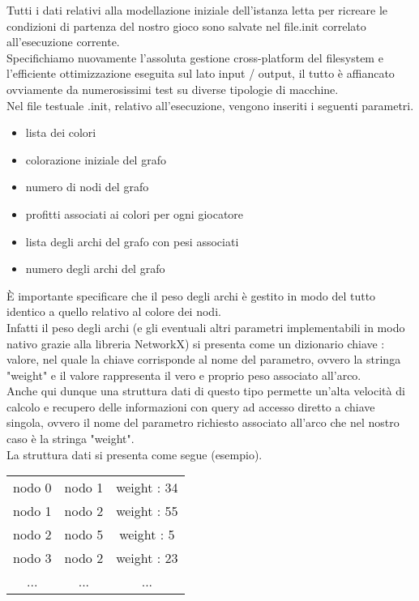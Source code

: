 Tutti i dati relativi alla modellazione iniziale dell'istanza letta per ricreare le condizioni di partenza del nostro gioco sono salvate nel file.init correlato all'esecuzione corrente.\\

Specifichiamo nuovamente l'assoluta gestione cross-platform del filesystem e l'efficiente ottimizzazione eseguita sul lato input / output, il tutto è affiancato ovviamente da numerosissimi test su diverse tipologie di macchine.\\

Nel file testuale .init, relativo all'esecuzione, vengono inseriti i seguenti parametri.

\begin{itemize}
	\item lista dei colori
	\item colorazione iniziale del grafo
	\item numero di nodi del grafo
	\item profitti associati ai colori per ogni giocatore
	\item lista degli archi del grafo con pesi associati
	\item numero degli archi del grafo
\end{itemize}

È importante specificare che il peso degli archi è gestito in modo del tutto identico a quello relativo al colore dei nodi.\\
Infatti il peso degli archi (e gli eventuali altri parametri implementabili in modo nativo grazie alla libreria NetworkX) si presenta come un dizionario chiave : valore, nel quale la chiave corrisponde al nome del parametro, ovvero la stringa "weight" e il valore rappresenta il vero e proprio peso associato all'arco.\\

Anche qui dunque una struttura dati di questo tipo permette un'alta velocità di calcolo e recupero delle informazioni con query ad accesso diretto a chiave singola, ovvero il nome del parametro richiesto associato all'arco che nel nostro caso è la stringa "weight".\\
La struttura dati si presenta come segue (esempio).

\begin{table}[H]
\centering
\begin{tabular}{ccc}
nodo 0 & nodo 1 & weight : 34 \\
nodo 1 & nodo 2 & weight : 55 \\
nodo 2 & nodo 5 & weight : 5 \\
nodo 3 & nodo 2 & weight : 23 \\
... & ... & ...
\end{tabular}
\end{table}

